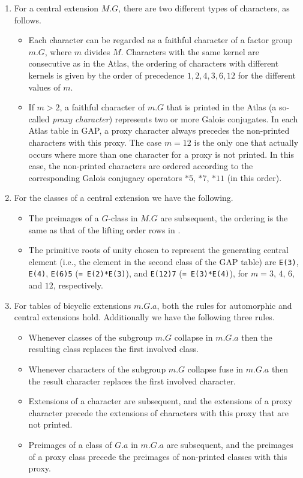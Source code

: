 \documentclass[a4paper,11pt]{report}
\begin{document}
{{{\begin{enumerate}
\item  For a central extension $M.G$, there are two different types of characters, as follows. 
\begin{itemize}
\item  Each character can be regarded as a faithful character of a factor group $m.G$, where $m$ divides $M$. Characters with the same kernel are consecutive as in the \textsf{Atlas}, the ordering of characters with different kernels is given by the order of
precedence $1, 2, 4, 3, 6, 12$ for the different values of $m$. 
\item  If $m > 2$, a faithful character of $m.G$ that is printed in the \textsf{Atlas} (a so-called \emph{proxy character}) represents two or more Galois conjugates. In each \textsf{Atlas} table in \textsf{GAP}, a proxy character always precedes the non-printed characters with this
proxy. The case $m = 12$ is the only one that actually occurs where more than one character for a proxy
is not printed. In this case, the non-printed characters are ordered according
to the corresponding Galois conjugacy operators $*5$, $*7$, $*11$ (in this order). 
\end{itemize}
 
\item  For the classes of a central extension we have the following. 
\begin{itemize}
\item  The preimages of a $G$-class in $M.G$ are subsequent, the ordering is the same as that of the lifting order rows in \cite[Chapter{\nobreakspace}7, Section{\nobreakspace}7]{CCN85}. 
\item  The primitive roots of unity chosen to represent the generating central
element (i.{\nobreakspace}e., the element in the second class of the \textsf{GAP} table) are \texttt{E(3)}, \texttt{E(4)}, \texttt{E(6)\texttt{}5} (\texttt{= E(2)*E(3)}), and \texttt{E(12)\texttt{}7} (\texttt{= E(3)*E(4)}), for $m = 3$, $4$, $6$, and $12$, respectively. 
\end{itemize}
 
\item  For tables of bicyclic extensions $m.G.a$, both the rules for automorphic and central extensions hold. Additionally we
have the following three rules. 
\begin{itemize}
\item  Whenever classes of the subgroup $m.G$ collapse in $m.G.a$ then the resulting class replaces the first involved class. 
\item  Whenever characters of the subgroup $m.G$ collapse fuse in $m.G.a$ then the result character replaces the first involved character. 
\item  Extensions of a character are subsequent, and the extensions of a proxy
character precede the extensions of characters with this proxy that are not
printed. 
\item  Preimages of a class of $G.a$ in $m.G.a$ are subsequent, and the preimages of a proxy class precede the preimages of
non-printed classes with this proxy. 
\end{itemize}
 

\end{enumerate}}}}
\end{document}
